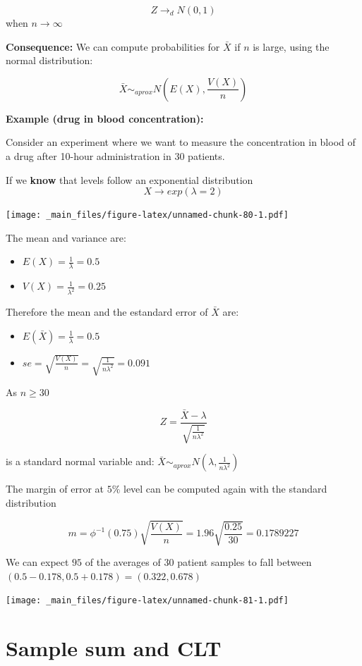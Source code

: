 \documentclass[
]{book}
\providecommand{\tightlist}{%
  \setlength{\itemsep}{0pt}\setlength{\parskip}{0pt}}
\begin{document}
\[Z \rightarrow_d N(0,1)\] when \(n\rightarrow \infty\)

\textbf{Consequence:} We can compute probabilities for \(\bar{X}\) if \(n\) is large, using the normal distribution:

\[\bar{X} \sim_{aprox}  N(E(X), \frac{V(X)}{n})\]

\textbf{Example (drug in blood concentration):}

Consider an experiment where we want to measure the concentration in blood of a drug after 10-hour administration in \(30\) patients.

If we \textbf{know} that levels follow an exponential distribution \[X \rightarrow exp(\lambda=2)\]

\texttt{[image: \_main\_files/figure-latex/unnamed-chunk-80-1.pdf]}

The mean and variance are:

\begin{itemize}
\tightlist
\item
  \(E(X)=\frac{1}{\lambda}=0.5\)
\item
  \(V(X)=\frac{1}{\lambda^2}=0.25\)
\end{itemize}

Therefore the mean and the estandard error of \(\bar{X}\) are:

\begin{itemize}
\tightlist
\item
  \(E(\bar{X})=\frac{1}{\lambda}=0.5\)
\item
  \(se=\sqrt{\frac{V(X)}{n}}=\sqrt{\frac{1}{n\lambda^2}}=0.091\)
\end{itemize}

As \(n \geq 30\)

\[Z=\frac{\bar{X}-\lambda}{\sqrt{\frac{1}{n\lambda^2}}}\]

is a standard normal variable and: \(\bar{X} \sim_{aprox} N(\lambda, \frac{1}{n\lambda^2})\)

The margin of error at \(5\%\) level can be computed again with the standard distribution

\[m=\phi^{-1}(0.75) \sqrt{\frac{V(X)}{n}}=1.96\sqrt{\frac{0.25}{30}}=0.1789227\]

We can expect \(95%
\) of the averages of \(30\) patient samples to fall between
\((0.5-0.178, 0.5+0.178)= (0.322, 0.678)\)

\texttt{[image: \_main\_files/figure-latex/unnamed-chunk-81-1.pdf]}

\hypertarget{sample-sum-and-clt}{%
\section{Sample sum and CLT}\label{sample-sum-and-clt}}
\end{document}
